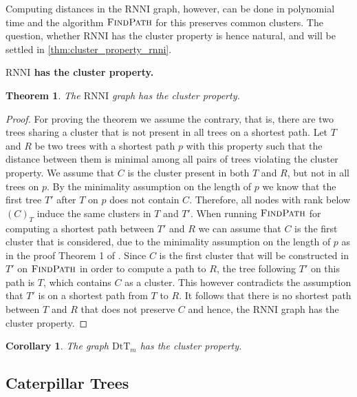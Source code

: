 \documentclass[11pt]{amsart}
\newtheorem{theorem}{Theorem}
\newtheorem{corollary}{Corollary}
\newcommand{\rnni}{\mathrm{RNNI}}
\newcommand{\findpath}{\textsc{FindPath}}
\newcommand{\dtt}{\mathrm{DtT}}
\newcommand{\summary}[1]{\textbf{#1}} %
\begin{document}
Computing distances in the $\rnni$ graph, however, can be done in polynomial time and the algorithm $\findpath$ for this \autocite{Collienne2020-iu} preserves common clusters.
The question, whether $\rnni$ has the cluster property is hence natural, and will be settled in \autoref{thm:cluster_property_rnni}.

\summary{$\rnni$ has the cluster property.}
\begin{theorem}
	The $\rnni$ graph has the cluster property.
	\label{thm:cluster_property_rnni}
\end{theorem}

\begin{proof}
	For proving the theorem we assume the contrary, that is, there are two trees sharing a cluster that is not present in all trees on a shortest path.
	Let $T$ and $R$ be two trees with a shortest path $p$ with this property such that the distance between them is minimal among all pairs of trees violating the cluster property.
	We assume that $C$ is the cluster present in both $T$ and $R$, but not in all trees on $p$.
	By the minimality assumption on the length of $p$ we know that the first tree $T'$ after $T$ on $p$ does not contain $C$.
	Therefore, all nodes with rank below $(C)_T$ induce the same clusters in $T$ and $T'$.
	When running $\findpath$ for computing a shortest path between $T'$ and $R$ we can assume that $C$ is the first cluster that is considered, due to the minimality assumption on the length of $p$ as in the proof Theorem 1 of \textcite{Collienne2020-iu}.
	Since $C$ is the first cluster that will be constructed in $T'$ on $\findpath$ in order to compute a path to $R$, the tree following $T'$ on this path is $T$, which contains $C$ as a cluster.
	This however contradicts the assumption that $T'$ is on a shortest path from $T$ to $R$.
	It follows that there is no shortest path between $T$ and $R$ that does not preserve $C$ and hence, the $\rnni$ graph has the cluster property.
\end{proof}

\begin{corollary}
	The graph $\dtt_m$ has the cluster property.
\end{corollary}


\subsection{Caterpillar Trees}
\end{document}
